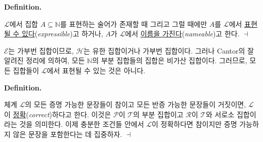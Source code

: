 \documentclass[12pt]{paper}
\newenvironment{context}[1][]
{ \noindent \textbf{{#1}.}
}
{ \hfill $ \dashv $
}
\begin{document}
  \begin{context}[Definition]
    $\mathcal{L}$에서 집합 $A \subseteq \mathbb{N}$를 표현하는 술어가 존재할 때 그리고 그럴 때에만
    $A$를 $\mathcal{L}$에서 \underline{표현될 수 있다}(\textit{expressible})고 하거나,
    $A$가 $\mathcal{L}$에서 \underline{이름을 가진다}(\textit{nameable})고 한다.
  \end{context}

  $\mathcal{E}$는 가부번 집합이므로,
  $\mathcal{H}$는 유한 집합이거나 가부번 집합이다.
  그러나 Cantor의 잘 알려진 정리에 의하여,
  모든 $\mathbb{N}$의 부분 집합들의 집합은 비가산 집합이다.
  그러므로, 모든 집합들이 $\mathcal{L}$에서 표현될 수 있는 것은 아니다.
  
  \begin{context}[Definition]
    체계 $\mathcal{L}$의 모든 증명 가능한 문장들이 참이고 모든 반증 가능한 문장들이 거짓이면,
    $\mathcal{L}$이 \underline{정확}(\textit{correct})하다고 한다.
    이것은 $\mathcal{P}$이 $\mathcal{T}$의 부분 집합이고 $\mathcal{R}$이 $\mathcal{T}$와 서로소 집합이라는 것을 의미한다.
    이제 충분한 조건들 안에서 $\mathcal{L}$이 정확하다면 참이지만 증명 가능하지 않은 문장을 포함한다는 데 집중하자.
  \end{context}
\end{document}
